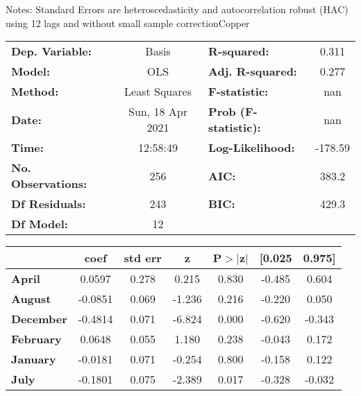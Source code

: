 Notes: \newline
 [1] Standard Errors are heteroscedasticity and autocorrelation robust (HAC) using 12 lags and without small sample correctionCopper\begin{center}
\begin{tabular}{lclc}
\toprule
\textbf{Dep. Variable:}    &      Basis       & \textbf{  R-squared:         } &     0.311   \\
\textbf{Model:}            &       OLS        & \textbf{  Adj. R-squared:    } &     0.277   \\
\textbf{Method:}           &  Least Squares   & \textbf{  F-statistic:       } &       nan   \\
\textbf{Date:}             & Sun, 18 Apr 2021 & \textbf{  Prob (F-statistic):} &      nan    \\
\textbf{Time:}             &     12:58:49     & \textbf{  Log-Likelihood:    } &   -178.59   \\
\textbf{No. Observations:} &         256      & \textbf{  AIC:               } &     383.2   \\
\textbf{Df Residuals:}     &         243      & \textbf{  BIC:               } &     429.3   \\
\textbf{Df Model:}         &          12      & \textbf{                     } &             \\
\bottomrule
\end{tabular}
\begin{tabular}{lcccccc}
                   & \textbf{coef} & \textbf{std err} & \textbf{z} & \textbf{P$> |$z$|$} & \textbf{[0.025} & \textbf{0.975]}  \\
\midrule
\textbf{April}     &       0.0597  &        0.278     &     0.215  &         0.830        &       -0.485    &        0.604     \\
\textbf{August}    &      -0.0851  &        0.069     &    -1.236  &         0.216        &       -0.220    &        0.050     \\
\textbf{December}  &      -0.4814  &        0.071     &    -6.824  &         0.000        &       -0.620    &       -0.343     \\
\textbf{February}  &       0.0648  &        0.055     &     1.180  &         0.238        &       -0.043    &        0.172     \\
\textbf{January}   &      -0.0181  &        0.071     &    -0.254  &         0.800        &       -0.158    &        0.122     \\
\textbf{July}      &      -0.1801  &        0.075     &    -2.389  &         0.017        &       -0.328    &       -0.032     \\

\end{tabular}
\end{center}
